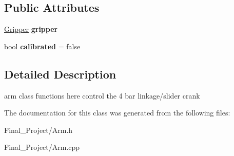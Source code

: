 \subsection*{Public Attributes}
\begin{DoxyCompactItemize}
\item 
\hypertarget{classArm_a1f237e56fc1e76c2b63f1f59d847945d}{\hyperlink{classGripper}{Gripper} {\bfseries gripper}}\label{classArm_a1f237e56fc1e76c2b63f1f59d847945d}

\item 
\hypertarget{classArm_a3f6c85e5a8feacd8870b653a8163d99f}{bool {\bfseries calibrated} = false}\label{classArm_a3f6c85e5a8feacd8870b653a8163d99f}

\end{DoxyCompactItemize}


\subsection{Detailed Description}
arm class functions here control the 4 bar linkage/slider crank 

The documentation for this class was generated from the following files\-:\begin{DoxyCompactItemize}
\item 
Final\-\_\-\-Project/Arm.\-h\item 
Final\-\_\-\-Project/Arm.\-cpp\end{DoxyCompactItemize}
